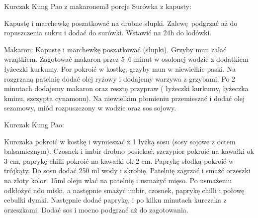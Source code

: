 \documentclass[a4paper,12pt]{article}
\begin{document}
\begin{recipe}{Kurczak Kung Pao z makaronem}{3 porcje}{}
\freeform%
Surówka z kapusty:

Kapustę i marchewkę poszatkować na drobne słupki. Zalewę podgrzać aż do ropuszczenia cukru i dodać do surówki. Wstawić na 24h do lodówki.

\freeform%
Makaron:
Kapustę i marchewkę poszatkować (słupki). Grzyby mun zalać wrzątkiem. Zagotować makaron przez 5--6 minut w osolonej wodzie z dodatkiem  łyżeczki kurkumy.
Por pokroić w kostkę, grzyby mun w niewielkie paski. Na rozgrzaną patelnię dodać olej ryżowy i dodajemy warzywa z grzybami.
Po 2 minutach dodajemy makaron oraz resztę przypraw ( łyżeczki kurkumy, łyżeczka kminu, szczypta cynamonu). Na niewielkim płomieniu przemieszać i dodać olej sezamowy, miód rozpuszczony w wodzie oraz sos sojowy.

\newpage

\freeform%
Kurczak Kung Pao:

Kurczaka pokroić w kostkę i wymieszać z 1 łyżką sosu (sosy sojowe z octem balsamicznym). Czosnek i imbir drobno posiekać, szczypior pokroić na kawałki ok 3 cm, paprykę chilli pokroić na kawałki ok 2 cm. 
Paprykę słodką pokroić w trójkąty. Do sosu dodać 250 ml wody i skrobię. Patelnię zagrzać i smażć orzeszki na złoty kolor. 15ml oleju wlać na patelnię i usmażyć mięso. Po usmażeniu odkłożyć ndo miski, a następnie smażyć imbir, czosnek, paprykę chilli i połowę cebulki dymki. Następnie dodać paprykę, i po kilku minutach kurczaka z orzeszkami. Dodać sos i mocno podgrzać aż do zagotowania.

\end{recipe}
\end{document}
